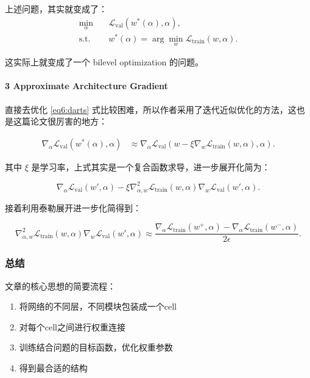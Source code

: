 上述问题，其实就变成了：
\begin{align}\label{eq6:darts}
	\min_{\alpha} \quad & \mathcal{L}_{\text{val}}\left(w^*(\alpha), \alpha\right), \\
	\text{s.t.} \quad & w^*(\alpha) = \arg\min_{w} \mathcal{L}_{\text{train}}(w, \alpha).
\end{align}

这实际上就变成了一个 bilevel optimization 的问题。

\paragraph{3 Approximate Architecture Gradient}

直接去优化 \eqref{eq6:darts} 式比较困难，所以作者采用了迭代近似优化的方法，这也是这篇论文很厉害的地方：

\begin{equation}
	\begin{split}
		\nabla_{\alpha} \mathcal{L}_{\text{val}}\left(w^*(\alpha), \alpha\right) &\approx \nabla_{\alpha} \mathcal{L}_{\text{val}}\left(w - \xi \nabla_w \mathcal{L}_{\text{train}}(w, \alpha), \alpha\right).
	\end{split}
\end{equation}

其中 $\xi$ 是学习率，上式其实是一个复合函数求导，进一步展开化简为：

\begin{equation}
	\nabla_{\alpha} \mathcal{L}_{\text{val}}\left(w', \alpha\right) - \xi \nabla_{\alpha,w}^2 \mathcal{L}_{\text{train}}(w, \alpha) \nabla_w \mathcal{L}_{\text{val}}\left(w', \alpha\right).
\end{equation}

接着利用泰勒展开进一步化简得到：

\begin{equation}
	\nabla_{\alpha,w}^2 \mathcal{L}_{\text{train}}(w, \alpha) \nabla_w \mathcal{L}_{\text{val}}\left(w', \alpha\right) \approx \frac{\nabla_{\alpha} \mathcal{L}_{\text{train}}\left(w^+, \alpha\right) - \nabla_{\alpha} \mathcal{L}_{\text{train}}\left(w^-, \alpha\right)}{2\epsilon}.
\end{equation}

\subsubsection{总结}
文章的核心思想的简要流程：
\begin{enumerate}
	\item 将网络的不同层，不同模块包装成一个cell
	\item 对每个cell之间进行权重连接
	\item 训练结合问题的目标函数，优化权重参数
	\item 得到最合适的结构
\end{enumerate}















